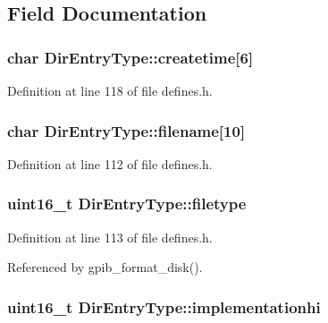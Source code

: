 \subsection{Field Documentation}
\subsubsection[{\texorpdfstring{createtime}{createtime}}]{\setlength{\rightskip}{0pt plus 5cm}char Dir\+Entry\+Type\+::createtime\mbox{[}6\mbox{]}}\hypertarget{structDirEntryType_a627fd55537c73d4fee596b140e106c01}{}\label{structDirEntryType_a627fd55537c73d4fee596b140e106c01}


Definition at line 118 of file defines.\+h.

\subsubsection[{\texorpdfstring{filename}{filename}}]{\setlength{\rightskip}{0pt plus 5cm}char Dir\+Entry\+Type\+::filename\mbox{[}10\mbox{]}}\hypertarget{structDirEntryType_aa60fae0a6b7ba9c966cbcf46e555f396}{}\label{structDirEntryType_aa60fae0a6b7ba9c966cbcf46e555f396}


Definition at line 112 of file defines.\+h.

\subsubsection[{\texorpdfstring{filetype}{filetype}}]{\setlength{\rightskip}{0pt plus 5cm}uint16\+\_\+t Dir\+Entry\+Type\+::filetype}\hypertarget{structDirEntryType_ada14562440087858ebf04bc4c81eedd2}{}\label{structDirEntryType_ada14562440087858ebf04bc4c81eedd2}


Definition at line 113 of file defines.\+h.



Referenced by gpib\+\_\+format\+\_\+disk().

\subsubsection[{\texorpdfstring{implementationhi}{implementationhi}}]{\setlength{\rightskip}{0pt plus 5cm}uint16\+\_\+t Dir\+Entry\+Type\+::implementationhi}\hypertarget{structDirEntryType_a27a15eea3264d44c9e93e3be77093151}{}\label{structDirEntryType_a27a15eea3264d44c9e93e3be77093151}


